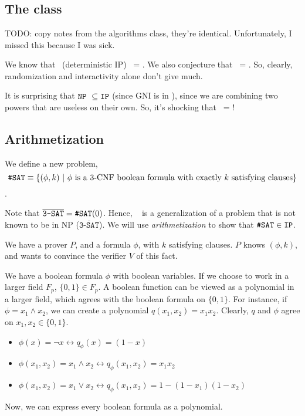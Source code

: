 \chapter{\ip}

\section{The class \ip}
TODO: copy notes from the algorithms class, they're identical. Unfortunately,
I missed this because I was sick.

We know that \dip~(deterministic IP) ~= \nptime. We also conjecture that
\ptime~= \bpp. So, clearly, randomization and interactivity alone don't
give much.

It is surprising that $\texttt{NP}~\subseteq \texttt{IP}$ (since GNI is in \ip), since we
are combining two powers that are useless on their own. So, it's shocking
that \ip~= \pspace!


\section{Arithmetization}

We define a new problem, $$\texttt{\#SAT} \equiv \{ (\phi, k)~\vert~ \phi~\text{is a 3-CNF boolean formula with exactly $k$ satisfying clauses} \}$$.

Note that $\overline{\texttt{3-SAT}} = \texttt{\#SAT}(0)$. Hence, \hashsat~ is a
generalization of a problem that is not known to be in NP ($\overline{\texttt{3-SAT}}$).  We will use \textit{arithmetization} to show that $\texttt{\#SAT} \in \texttt{IP}$.

We have a prover $P$, and a formula $\phi$, with $k$ satisfying clauses.
$P$ knows $(\phi, k)$, and wants to convince the verifier $V$ of this fact.

We have a boolean formula $\phi$ with boolean variables. If we choose to
work in a larger field $F_p$, $\{0, 1\} \in F_p$. A boolean function
can be viewed as a polynomial in a larger field, which agrees with the
boolean formula on $\{0, 1\}$. For instance, if $\phi = x_1 \land x_2$,
we can create a polynomial $q(x_1, x_2) = x_1 x_2$. Clearly, $q$ and $\phi$ agree
on $x_1, x_2 \in \{0, 1\}$.

\begin{itemize}
\item $\phi(x) = \lnot x \leftrightarrow q_\phi(x) = (1 - x)$
\item $\phi(x_1, x_2) = x_1 \land x_2 \leftrightarrow q_\phi(x_1, x_2) = x_1 x_2$
\item $\phi(x_1, x_2) = x_1 \lor x_2 \leftrightarrow q_\phi(x_1, x_2) = 1 - (1 - x_1)(1 - x_2)$
\end{itemize}
Now, we can express every boolean formula as a polynomial.


